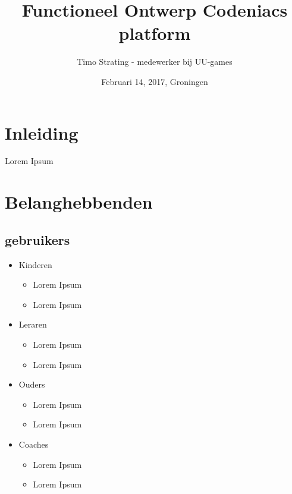 \documentclass[]{report}
\title{Functioneel Ontwerp Codeniacs platform}
\author{Timo Strating - medewerker bij UU-games}
\date{Februari 14, 2017, Groningen}
\begin{document}
\maketitle

\tableofcontents
\newpage






\chapter{Inleiding}

Lorem Ipsum




\chapter{Belanghebbenden}

\section{gebruikers}
\begin{itemize}
	\item Kinderen
	\begin{itemize}
		\item Lorem Ipsum
		\item Lorem Ipsum
			\newline
	\end{itemize} 

	\item Leraren
	\begin{itemize}
		\item Lorem Ipsum
		\item Lorem Ipsum
		\newline
	\end{itemize} 

	\item Ouders
	\begin{itemize}
		\item Lorem Ipsum
		\item Lorem Ipsum
		\newline
	\end{itemize} 
	
	\item Coaches
	\begin{itemize}
		\item Lorem Ipsum
		\item Lorem Ipsum
		\newline
	\end{itemize} 
\end{itemize}
\end{document}
